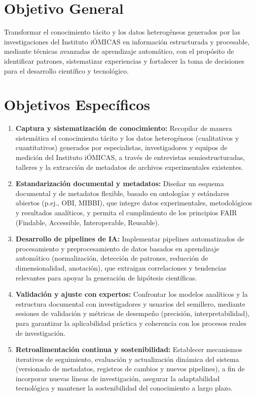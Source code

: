 \section{Objetivo General}
Transformar el conocimiento tácito y los datos heterogéneos generados por las investigaciones del Instituto iÓMICAS en información estructurada y procesable, mediante técnicas avanzadas de aprendizaje automático, con el propósito de identificar patrones, sistematizar experiencias y fortalecer la toma de decisiones para el desarrollo científico y tecnológico.

\section{Objetivos Específicos}

\begin{enumerate}
  \item \textbf{Captura y sistematización de conocimiento:}  
    Recopilar de manera sistemática el conocimiento tácito y los datos heterogéneos (cualitativos y cuantitativos) generados por especialistas, investigadores y equipos de medición del Instituto iÓMICAS, a través de entrevistas semiestructuradas, talleres y la extracción de metadatos de archivos experimentales existentes.

  \item \textbf{Estandarización documental y metadatos:}  
    Diseñar un esquema documental y de metadatos flexible, basado en ontologías y estándares abiertos (p.ej., OBI, MIBBI), que integre datos experimentales, metodológicos y resultados analíticos, y permita el cumplimiento de los principios FAIR (Findable, Accessible, Interoperable, Reusable).

  \item \textbf{Desarrollo de pipelines de IA:}  
    Implementar pipelines automatizados de procesamiento y preprocesamiento de datos basados en aprendizaje automático (normalización, detección de patrones, reducción de dimensionalidad, anotación), que extraigan correlaciones y tendencias relevantes para apoyar la generación de hipótesis científicas.

  \item \textbf{Validación y ajuste con expertos:}  
    Confrontar los modelos analíticos y la estructura documental con investigadores y usuarios del semillero, mediante sesiones de validación y métricas de desempeño (precisión, interpretabilidad), para garantizar la aplicabilidad práctica y coherencia con los procesos reales de investigación.

  \item \textbf{Retroalimentación continua y sostenibilidad:}  
    Establecer mecanismos iterativos de seguimiento, evaluación y actualización dinámica del sistema (versionado de metadatos, registros de cambios y nuevos pipelines), a fin de incorporar nuevas líneas de investigación, asegurar la adaptabilidad tecnológica y mantener la sostenibilidad del conocimiento a largo plazo.
\end{enumerate}